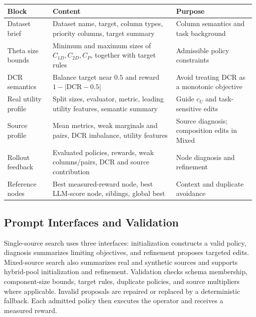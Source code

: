 \documentclass[conference]{IEEEtran}
\begin{document}
\par\medskip\noindent\begin{minipage}{\textwidth}
\centering
{}
\label{supp:prompt-blocks}
\small
\begin{tabularx}{\textwidth}{@{}p{}X p{}@{}}
\toprule
Block & Content & Purpose\\
\midrule
Dataset brief & Dataset name, target, column types, priority columns, target summary & Column semantics and task background\\
Theta size bounds & Minimum and maximum sizes of $C_{1D},C_{2D},C_P$, together with target rules & Admissible policy constraints\\
DCR semantics & Balance target near $0.5$ and reward $1-|\mathrm{DCR}-0.5|$ & Avoid treating DCR as a monotonic objective\\
Real utility profile & Split sizes, evaluator, metric, leading utility features, semantic summary & Guide $c_U$ and task-sensitive edits\\
Source profile & Mean metrics, weak marginals and pairs, DCR imbalance, utility features & Source diagnosis; composition edits in Mixed\\
Rollout feedback & Evaluated policies, rewards, weak columns/pairs, DCR and source contribution & Node diagnosis and refinement\\
Reference nodes & Best measured-reward node, best LLM-score node, siblings, global best & Context and duplicate avoidance\\
\bottomrule
\end{tabularx}
\end{minipage}\par\medskip

\subsection{Prompt Interfaces and Validation}
Single-source search uses three interfaces: initialization constructs a valid policy, diagnosis summarizes limiting objectives, and refinement proposes targeted edits. Mixed-source search also summarizes real and synthetic sources and supports hybrid-pool initialization and refinement. Validation checks schema membership, component-size bounds, target rules, duplicate policies, and source multipliers where applicable. Invalid proposals are repaired or replaced by a deterministic fallback. Each admitted policy then executes the operator and receives a measured reward.
\end{document}
